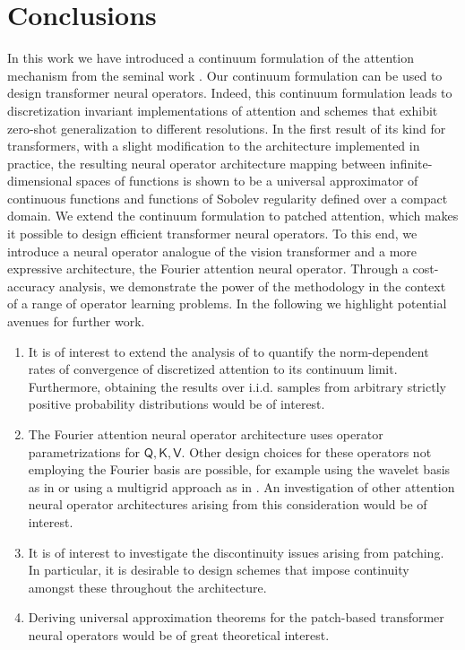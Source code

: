 \documentclass[twoside]{article}
\newcommand{\1}{\mathbbm{1}}
\newcommand{\sQ}{\mathsf{Q}}
\newcommand{\sK}{\mathsf{K}}
\newcommand{\sV}{\mathsf{V}}
\begin{document}

\section{Conclusions}

In this work we have introduced a continuum formulation of the attention mechanism from the seminal work \citet{vaswani2017attention}. Our continuum formulation can be used to design transformer neural operators. Indeed, this continuum formulation leads to discretization invariant implementations of attention and schemes that exhibit zero-shot generalization to different resolutions. In the first result of its kind for transformers, with a slight modification to the architecture implemented in practice, the resulting neural operator architecture mapping between infinite-dimensional spaces of functions is shown to be a universal approximator of continuous functions and functions of Sobolev regularity defined over a compact domain. We extend the continuum formulation to patched attention, which makes it possible to design efficient transformer neural operators. To this end, we introduce a neural operator analogue of the vision transformer \citet{dosovitskyi2021image} and a more expressive architecture, the Fourier attention neural operator. Through a cost-accuracy analysis, we demonstrate the power of the methodology in the context of a range of operator learning problems. In the following we highlight potential avenues for further work.

\begin{enumerate}
    \item It is of interest to extend the analysis of  to quantify the norm-dependent rates of convergence of discretized attention to its continuum limit. Furthermore, obtaining the results over i.i.d. samples from arbitrary strictly positive probability distributions would be of interest.

    \item The Fourier attention neural operator architecture uses operator parametrizations for $\sQ,\sK,\sV$. Other design choices for these operators not employing the Fourier basis are possible, for example using the wavelet basis as in \cite{TRIPURA2023115783} or using a multigrid approach as in \cite{he2024mgno}. An investigation of other attention neural operator architectures arising from this consideration would be of interest.

    \item It is of interest to investigate the discontinuity 
    issues arising from patching. In particular, it is desirable to design schemes that impose continuity amongst these throughout the architecture. 
    
    \item Deriving universal approximation theorems for the patch-based transformer neural operators would be of great theoretical interest.
\end{enumerate}
    
\end{document}
